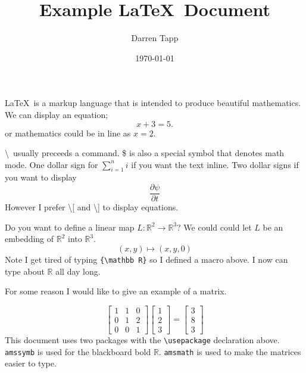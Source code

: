 \documentclass{article}
\title{Example \LaTeX\  Document}
\author{Darren Tapp}
\date{\today}
\newcommand{\RR}{{\mathbb R}}
\begin{document}
\maketitle
\LaTeX\  is a markup language that is intended to produce beautiful
mathematics.  We can display an equation;
\[
x+3 = 5.
\]
or mathematics could be in line as $x=2$.

\textbackslash\ usually preceeds a command.  \$ is also a special symbol that
denotes math mode.  One dollar sign for $\sum_{i=1}^n i$ if you want
the text inline.  Two dollar signs if you want to display
$$
\frac{\partial \psi }{\partial t}
$$
However I prefer \textbackslash [ and \textbackslash ] to display equations.

Do you want to define a linear map $L:{\mathbb R}^2\to {\mathbb R}^3$?  We could
could let $L$ be an embedding of ${\mathbb R}^2$ into ${\mathbb R}^3$.
\[
(x,y) \mapsto (x,y,0)
\]
Note I get tired of typing \verb|{\mathbb R}| so I defined a macro above.  I
now can type about $\RR$ all day long.

For some reason I would like to give an example of a matrix.

\[
\begin{bmatrix}
1& 1& 0 \\
0& 1 & 2 \\
0 & 0 & 1
\end{bmatrix}
\begin{bmatrix}
1 \\
2 \\
3
\end{bmatrix}
=
\begin{bmatrix}
3 \\
8 \\
3
\end{bmatrix}
\]
This document uses two packages with the \verb|\usepackage| declaration above.
\verb|amssymb| is used for the blackboard bold $\RR$.  \verb|amsmath| is used
to make the matrices easier to type.
\end{document}
